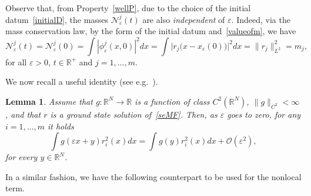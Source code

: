 \documentclass[11pt]{amsart}
\numberwithin{equation}{section}
\newtheorem{lemma}[theorem]{Lemma}
\theoremstyle{definition}
\begin{document}
Observe that, from Property~\ref{wellP}, due to the choice of
the initial datum~\eqref{initialD}, the masses ${\mathcal
N}_{\varepsilon}^j(t)$ are also {\em independent} of ${\varepsilon}$. Indeed, via the
mass conservation law, by the form of the initial datum and~\eqref{valueofm},
we have
\begin{equation}\label{eqmi}
{\mathcal N_{\varepsilon}^j(t)}={\mathcal
N_{\varepsilon}^j(0)}=\int|\phi_{\varepsilon}^j(x,0)|^{2}dx=\int
\Big|r_j\Big(x-x_{\varepsilon}(0)\Big)
\Big|^{2}dx=\|r_j\|^2_{L^2}=m_j,
\end{equation} for all ${\varepsilon}>0$, $t\in{{\mathbb R}}^+$
and $j=1,\dots,m$.

\vskip4pt
\noindent
We now recall a useful identity (see e.g.~\cite[Lemma 3.3]{Keerani2}).

\begin{lemma}\label{pote}
Assume that $g:{{\mathbb R}}^N\to{{\mathbb R}}$ is a function of class $C^{2}({{\mathbb R}}^N)$,
$\|g\|_{C^2}<\infty$, and that $r$ is a ground state solution
of~\eqref{seMF}. Then, as ${\varepsilon}$ goes to zero, for any $i=1,\dots,m$ it holds
\begin{equation*}
\int g({\varepsilon} x+y)r^2_i(x)dx=\int g(y)r^2_i(x)dx+{\mathcal O}({\varepsilon}^2),
\end{equation*}
for every $y\in {{\mathbb R}}^N$.
\end{lemma}

\vskip2pt
\noindent
In a similar fashion, we have the following counterpart to be used for the nonlocal term.
\end{document}
